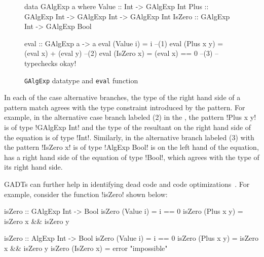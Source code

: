 \documentclass[screen,nonacm,manuscript,review]{acmart} %
\begin{document}
\begin{figure}[ht]
\centering
\begin{minipage}[ht]{0.6\linewidth}
\begin{CenteredBox}
\begin{code}
data GAlgExp a where
  Value  :: Int                        -> GAlgExp Int
  Plus   :: GAlgExp Int -> GAlgExp Int -> GAlgExp Int
  IsZero :: GAlgExp Int                -> GAlgExp Bool
\end{code}
\end{CenteredBox}
\end{minipage}%
\begin{minipage}[ht]{0.4\linewidth}
\begin{CenteredBox}
\begin{code}
eval :: GAlgExp a -> a
eval (Value i) = i                    --(1)
eval (Plus x y) = (eval x) + (eval y) --(2)
eval (IsZero x) = (eval x) == 0       --(3)
                   -- typechecks okay!
\end{code}
\end{CenteredBox}
\end{minipage}%
\caption{\texttt{GAlgExp} datatype and \texttt{eval} function}
\label{fig:galgexp-eval}
\end{figure}

In each of the case alternative branches, the type of the right hand side of a
pattern match agrees with the type constraint introduced by the
pattern. For example, in the alternative case branch labeled (2)
in the , the
pattern !Plus x y! is of type !GAlgExp Int! and the type of the
resultant on the right hand side of the equation is of type !Int!.
Similarly, in the alternative branch labeled (3) with the pattern
!IsZero x! is of type !AlgExp Bool! is on the left hand of the
equation, has a right hand side of the equation
of type !Bool!, which agrees with the type of its right hand side.

GADTs can further help in identifying dead code and code
optimizations~\cite{xi_dead_1998,graf_lower_2020,nilsson_dynamic_2005}.
For example, consider the function !isZero! shown below:

\begin{minipage}[ht]{0.5\linewidth}
\begin{CenteredBox}
\begin{code}
isZero :: GAlgExp Int -> Bool
isZero (Value i) = i == 0
isZero (Plus x y) = isZero x && isZero y
\end{code}
\end{CenteredBox}
\end{minipage}%
\begin{minipage}{0.5\linewidth}
\begin{CenteredBox}
\begin{code}
isZero :: AlgExp Int -> Bool
isZero (Value i) = i == 0
isZero (Plus x y) = isZero x && isZero y
isZero (IsZero x) = error "impossible"
\end{code}
\end{CenteredBox}
\end{minipage}
\end{document}
